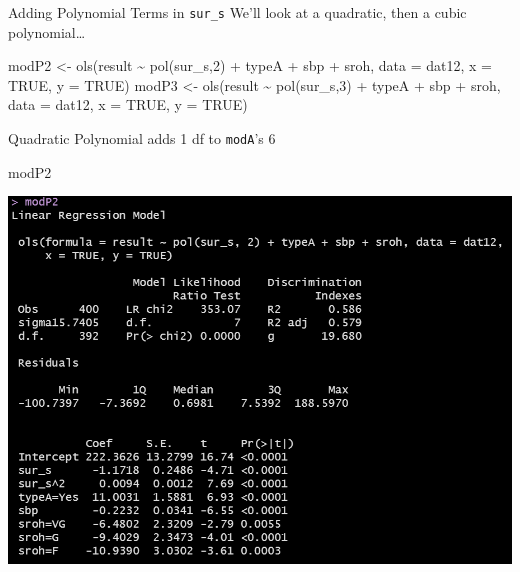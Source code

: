 \documentclass[
  ignorenonframetext,
]{beamer}
\newenvironment{Shaded}{\begin{snugshade}}{\end{snugshade}}
\newcommand{\AttributeTok}[1]{\textcolor[rgb]{0.77,0.63,0.00}{#1}}
\newcommand{\ConstantTok}[1]{\textcolor[rgb]{0.00,0.00,0.00}{#1}}
\newcommand{\DecValTok}[1]{\textcolor[rgb]{0.00,0.00,0.81}{#1}}
\newcommand{\FunctionTok}[1]{\textcolor[rgb]{0.00,0.00,0.00}{#1}}
\newcommand{\NormalTok}[1]{#1}
\newcommand{\OtherTok}[1]{\textcolor[rgb]{0.56,0.35,0.01}{#1}}
\newcommand{\SpecialCharTok}[1]{\textcolor[rgb]{0.00,0.00,0.00}{#1}}
\begin{document}
\begin{frame}[fragile]{Adding Polynomial Terms in \texttt{sur\_s}}
\protect\hypertarget{adding-polynomial-terms-in-sur_s}{}
We'll look at a quadratic, then a cubic polynomial\ldots{}

\begin{Shaded}
\begin{Highlighting}[]
\NormalTok{modP2 }\OtherTok{\textless{}{-}} \FunctionTok{ols}\NormalTok{(result }\SpecialCharTok{\textasciitilde{}} \FunctionTok{pol}\NormalTok{(sur\_s,}\DecValTok{2}\NormalTok{) }\SpecialCharTok{+}\NormalTok{ typeA }\SpecialCharTok{+}\NormalTok{ sbp }\SpecialCharTok{+}\NormalTok{ sroh, }
               \AttributeTok{data =}\NormalTok{ dat12, }\AttributeTok{x =} \ConstantTok{TRUE}\NormalTok{, }\AttributeTok{y =} \ConstantTok{TRUE}\NormalTok{)}
\NormalTok{modP3 }\OtherTok{\textless{}{-}} \FunctionTok{ols}\NormalTok{(result }\SpecialCharTok{\textasciitilde{}} \FunctionTok{pol}\NormalTok{(sur\_s,}\DecValTok{3}\NormalTok{) }\SpecialCharTok{+}\NormalTok{ typeA }\SpecialCharTok{+}\NormalTok{ sbp }\SpecialCharTok{+}\NormalTok{ sroh, }
               \AttributeTok{data =}\NormalTok{ dat12, }\AttributeTok{x =} \ConstantTok{TRUE}\NormalTok{, }\AttributeTok{y =} \ConstantTok{TRUE}\NormalTok{)}
\end{Highlighting}
\end{Shaded}
\end{frame}

\begin{frame}[fragile]{Quadratic Polynomial adds 1 df to \texttt{modA}'s
6}
\protect\hypertarget{quadratic-polynomial-adds-1-df-to-modas-6}{}
\begin{Shaded}
\begin{Highlighting}[]
\NormalTok{modP2}
\end{Highlighting}
\end{Shaded}

\begin{center}\includegraphics[width=12.51in,height=0.65\textheight]{figures/small2} \end{center}
\end{frame}
\end{document}
